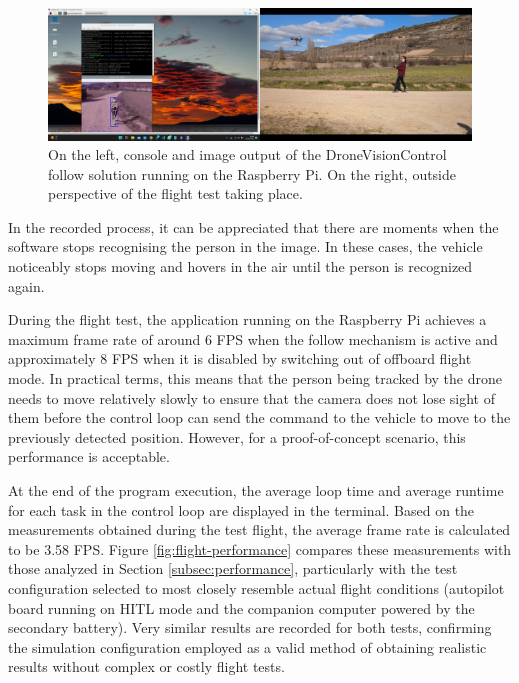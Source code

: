 \begin{figure}[H]
  \centering
  \includegraphics[width=\textwidth, keepaspectratio]{img/video-field-test-follow.png}
  \caption{On the left, console and image output of the DroneVisionControl follow solution running on the Raspberry Pi. On the right, outside perspective of the flight test taking place.}
  \label{fig:flight-test-follow}
\end{figure}

In the recorded process, it can be appreciated that there are moments when the software stops recognising the person in the image. In these cases, the vehicle noticeably stops moving and hovers in the air until the person is recognized again.

During the flight test, the application running on the Raspberry Pi achieves a maximum frame rate of around 6 FPS when the follow mechanism is active and approximately 8 FPS when it is disabled by switching out of offboard flight mode. In practical terms, this means that the person being tracked by the drone needs to move relatively slowly to ensure that the camera does not lose sight of them before the control loop can send the command to the vehicle to move to the previously detected position. However, for a proof-of-concept scenario, this performance is acceptable.

At the end of the program execution, the average loop time and average runtime for each task in the control loop are displayed in the terminal. Based on the measurements obtained during the test flight, the average frame rate is calculated to be 3.58 FPS. Figure \ref{fig:flight-performance} compares these measurements with those analyzed in Section \ref{subsec:performance}, particularly with the test configuration selected to most closely resemble actual flight conditions (autopilot board running on HITL mode and the companion computer powered by the secondary battery). Very similar results are recorded for both tests, confirming the simulation configuration employed as a valid method of obtaining realistic results without complex or costly flight tests.

